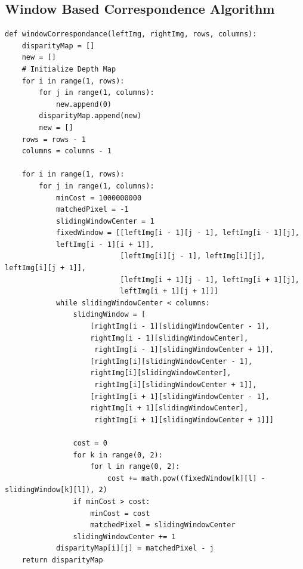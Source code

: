 \documentclass[11pt]{scrartcl}
\begin{document}
\subsection{Window Based Correspondence Algorithm}
\begin{verbatim}
def windowCorrespondance(leftImg, rightImg, rows, columns):
    disparityMap = []
    new = []
    # Initialize Depth Map
    for i in range(1, rows):
        for j in range(1, columns):
            new.append(0)
        disparityMap.append(new)
        new = []
    rows = rows - 1
    columns = columns - 1

    for i in range(1, rows):
        for j in range(1, columns):
            minCost = 1000000000
            matchedPixel = -1
            slidingWindowCenter = 1
            fixedWindow = [[leftImg[i - 1][j - 1], leftImg[i - 1][j], 
            leftImg[i - 1][i + 1]],
                           [leftImg[i][j - 1], leftImg[i][j], leftImg[i][j + 1]],
                           [leftImg[i + 1][j - 1], leftImg[i + 1][j], 
                           leftImg[i + 1][j + 1]]]
            while slidingWindowCenter < columns:
                slidingWindow = [
                    [rightImg[i - 1][slidingWindowCenter - 1], 
                    rightImg[i - 1][slidingWindowCenter],
                     rightImg[i - 1][slidingWindowCenter + 1]],
                    [rightImg[i][slidingWindowCenter - 1], 
                    rightImg[i][slidingWindowCenter],
                     rightImg[i][slidingWindowCenter + 1]],
                    [rightImg[i + 1][slidingWindowCenter - 1], 
                    rightImg[i + 1][slidingWindowCenter],
                     rightImg[i + 1][slidingWindowCenter + 1]]]

                cost = 0
                for k in range(0, 2):
                    for l in range(0, 2):
                        cost += math.pow((fixedWindow[k][l] - slidingWindow[k][l]), 2)
                if minCost > cost:
                    minCost = cost
                    matchedPixel = slidingWindowCenter
                slidingWindowCenter += 1
            disparityMap[i][j] = matchedPixel - j
    return disparityMap
\end{verbatim}
\newpage
\end{document}
